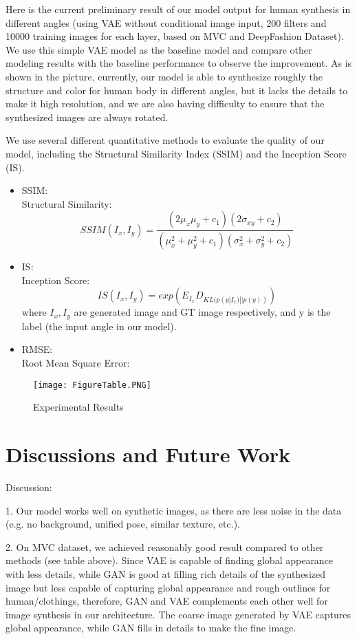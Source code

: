 \documentclass[10pt,conference]{IEEEtran}
\begin{document}
Here is the current preliminary result of our model output for human synthesis in different angles (using VAE without conditional image input, 200 filters and 10000 training images for each layer, based on MVC and DeepFashion Dataset). We use this simple VAE model as the  baseline model and compare other modeling results with the baseline performance to observe the improvement. As is shown in the picture, currently, our model is able to synthesize roughly the structure and color for human body in different angles, but it lacks the details to make it high resolution, and we are also having difficulty to ensure that the synthesized images are always rotated.



We use several different quantitative methods to evaluate the quality of our model, including the Structural Similarity Index (SSIM) and the Inception Score (IS).
\begin{itemize}


\item SSIM:\\
Structural Similarity:
$$SSIM(I_x,I_y)=\frac{(2\mu_x \mu_y + c_1)(2\sigma_{xy}+c_2)}{(\mu_x^2+\mu_y^2 +c_1)(\sigma_x^2+\sigma_y^2+c_2)}$$

\item IS:\\
Inception Score:
$$IS(I_x,I_y)=exp(E_{I_x}D_{KL(p(y|I_x)||p(y))})$$
where $I_x,I_y$ are generated image and GT image respectively, and y is the label (the input angle in our model).

\item RMSE:\\
Root Mean Square Error:


\end{itemize}

\begin{figure*}
  \texttt{[image: FigureTable.PNG]}
  \caption{Experimental Results}
  \label{fig:boat1}
\end{figure*}

\section{Discussions and Future Work}

Discussion:

1. Our model works well on synthetic images, as there are less noise in the data (e.g. no background, unified pose, similar texture, etc.).

2. On MVC dataset, we achieved reasonably good result compared to other methods (see table above). Since VAE is capable of finding 
global appearance with less details, while GAN is good at filling rich details of the synthesized image but less capable of capturing 
global appearance and rough outlines for human/clothings, therefore, GAN and VAE complements each other well for image synthesis 
in our architecture. The coarse image generated by VAE captures global appearance, while GAN fills in details to make the fine image.
\end{document}
